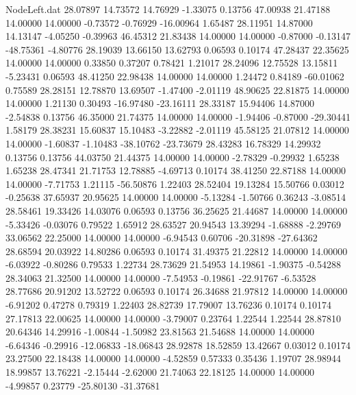 \begin{filecontents}{NodeLeft.dat}
  28.07897   14.73572   14.76929    -1.33075    0.13756   47.00938   21.47188   14.00000   14.00000   -0.73572   -0.76929  -16.00964    1.65487
  28.11951   14.87000   14.13147    -4.05250   -0.39963   46.45312   21.83438   14.00000   14.00000   -0.87000   -0.13147  -48.75361   -4.80776
  28.19039   13.66150   13.62793     0.06593    0.10174   47.28437   22.35625   14.00000   14.00000    0.33850    0.37207    0.78421    1.21017
  28.24096   12.75528   13.15811    -5.23431    0.06593   48.41250   22.98438   14.00000   14.00000    1.24472    0.84189  -60.01062    0.75589
  28.28151   12.78870   13.69507    -1.47400   -2.01119   48.90625   22.81875   14.00000   14.00000    1.21130    0.30493  -16.97480  -23.16111
  28.33187   15.94406   14.87000    -2.54838    0.13756   46.35000   21.74375   14.00000   14.00000   -1.94406   -0.87000  -29.30441    1.58179
  28.38231   15.60837   15.10483    -3.22882   -2.01119   45.58125   21.07812   14.00000   14.00000   -1.60837   -1.10483  -38.10762  -23.73679
  28.43283   16.78329   14.29932     0.13756    0.13756   44.03750   21.44375   14.00000   14.00000   -2.78329   -0.29932    1.65238    1.65238
  28.47341   21.71753   12.78885    -4.69713    0.10174   38.41250   22.87188   14.00000   14.00000   -7.71753    1.21115  -56.50876    1.22403
  28.52404   19.13284   15.50766     0.03012   -0.25638   37.65937   20.95625   14.00000   14.00000   -5.13284   -1.50766    0.36243   -3.08514
  28.58461   19.33426   14.03076     0.06593    0.13756   36.25625   21.44687   14.00000   14.00000   -5.33426   -0.03076    0.79522    1.65912
  28.63527   20.94543   13.39294    -1.68888   -2.29769   33.06562   22.25000   14.00000   14.00000   -6.94543    0.60706  -20.31898  -27.64362
  28.68594   20.03922   14.80286     0.06593    0.10174   31.49375   21.22812   14.00000   14.00000   -6.03922   -0.80286    0.79533    1.22734
  28.73629   21.54953   14.19861    -1.90375   -0.54288   28.34063   21.32500   14.00000   14.00000   -7.54953   -0.19861  -22.91767   -6.53528
  28.77686   20.91202   13.52722     0.06593    0.10174   26.34688   21.97812   14.00000   14.00000   -6.91202    0.47278    0.79319    1.22403
  28.82739   17.79007   13.76236     0.10174    0.10174   27.17813   22.00625   14.00000   14.00000   -3.79007    0.23764    1.22544    1.22544
  28.87810   20.64346   14.29916    -1.00844   -1.50982   23.81563   21.54688   14.00000   14.00000   -6.64346   -0.29916  -12.06833  -18.06843
  28.92878   18.52859   13.42667     0.03012    0.10174   23.27500   22.18438   14.00000   14.00000   -4.52859    0.57333    0.35436    1.19707
  28.98944   18.99857   13.76221    -2.15444   -2.62000   21.74063   22.18125   14.00000   14.00000   -4.99857    0.23779  -25.80130  -31.37681

\end{filecontents}
